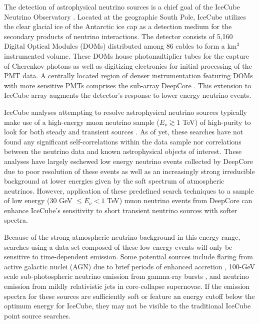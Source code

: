 \documentclass[manuscript]{aastex}
\begin{document}
The detection of astrophysical neutrino sources is a chief goal of the IceCube Neutrino Observatory \citep{2006APh....26..155I}. Located at the geographic South Pole, IceCube utilizes the clear glacial ice of the Antarctic ice cap as a detection medium for the secondary products of neutrino interactions. The detector consists of 5,160 Digital Optical Modules (DOMs) distributed among 86 cables to form a km$^3$ instrumented volume. These DOMs house photomultiplier tubes for the capture of Cherenkov photons as well as digitizing electronics for initial processing of the PMT data. A centrally located region of denser instrumentation featuring DOMs with more sensitive PMTs comprises the sub-array DeepCore \citep{2012APh....35..615A}. This extension to IceCube array augments the detector's response to lower energy neutrino events.

IceCube analyses attempting to resolve astrophysical neutrino sources typically make use of a high-energy muon neutrino sample ($E_{\nu} \gtrsim 1$ TeV) of high-purity to look for both steady \citep{2014ApJ...796..109A} and transient sources \citep{2015arXiv150300598A}. As of yet, these searches have not found any significant self-correlations within the data sample nor correlations between the neutrino data and known astrophysical objects of interest. These analyses have largely eschewed low energy neutrino events collected by DeepCore due to poor resolution of these events as well as an increasingly strong irreducible background at lower energies given by the soft spectrum of atmospheric neutrinos. However, application of these predefined search techniques to a sample of low energy (30 GeV $\leq E_{\nu} < 1$ TeV) muon neutrino events from DeepCore can enhance IceCube's sensitivity to short transient neutrino sources with softer spectra.

Because of the strong atmospheric neutrino background in this energy range, searches using a data set composed of these low energy events will only be sensitive to time-dependent emission. Some potential sources include flaring from active galactic nuclei (AGN) due to brief periods of enhanced accretion \citep{2009APh....31..138B}, 100-GeV scale sub-photospheric neutrino emission from gamma-ray bursts \citep{2013PhRvL.111m1102M}, and neutrino emission from mildly relativistic jets in core-collapse supernovae. If the emission spectra for these sources are sufficiently soft or feature an energy cutoff below the optimum energy for IceCube, they may not be visible to the traditional IceCube point source searches.
\end{document}
